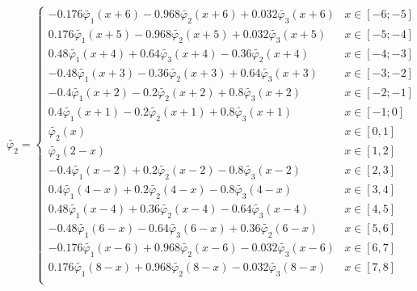 \documentclass[a4paper, 12pt,fleqn]{extarticle}
\begin{document}
    \[
        \tilde{\varphi_2}=
        \begin{cases}
           -0.176 \tilde{\varphi_1}(x+6) - 0.968 \tilde{\varphi_2}(x+6) + 0.032 \tilde{\varphi_3}(x+6)&x\in[-6;-5]\\
           0.176 \tilde{\varphi_1}(x+5) - 0.968 \tilde{\varphi_2}(x+5) + 0.032 \tilde{\varphi_3}(x+5)&x\in[-5;-4]\\
           0.48 \tilde{\varphi_1}(x+4) + 0.64 \tilde{\varphi_3}(x+4) - 0.36 \tilde{\varphi_2}(x+4)&x\in[-4;-3] \\
           -0.48 \tilde{\varphi_1}(x+3) - 0.36 \tilde{\varphi_2}(x+3) + 0.64 \tilde{\varphi_3}(x+3)&x\in[-3;-2] \\
           -0.4 \tilde{\varphi_1}(x+2) - 0.2 \tilde{\varphi_2}(x+2) + 0.8 \tilde{\varphi_3}(x+2)&x\in[-2;-1]\\
           0.4 \tilde{\varphi_1}(x+1) - 0.2 \tilde{\varphi_2}(x+1) + 0.8 \tilde{\varphi_3}(x+1)&x\in[-1;0]\\
           \tilde{\varphi_2}(x)&x\in[0,1]\\
           \tilde{\varphi_2}(2-x)&x\in[1,2]\\
           -0.4 \tilde{\varphi_1}(x-2) + 0.2 \tilde{\varphi_2}(x-2) - 0.8 \tilde{\varphi_3}(x-2)&x\in[2,3]\\
           0.4 \tilde{\varphi_1}(4-x) + 0.2 \tilde{\varphi_2}(4-x) - 0.8 \tilde{\varphi_3}(4-x) &x\in[3,4]\\
           0.48 \tilde{\varphi_1}(x-4) + 0.36 \tilde{\varphi_2}(x-4) - 0.64 \tilde{\varphi_3}(x-4)&x\in[4,5] \\
           -0.48 \tilde{\varphi_1}(6-x) - 0.64 \tilde{\varphi_3}(6-x) + 0.36 \tilde{\varphi_2}(6-x)&x\in[5,6] \\
           -0.176 \tilde{\varphi_1}(x-6) + 0.968 \tilde{\varphi_2}(x-6) - 0.032 \tilde{\varphi_3}(x-6)&x\in[6,7]\\
           0.176 \tilde{\varphi_1}(8-x) + 0.968 \tilde{\varphi_2}(8-x) - 0.032 \tilde{\varphi_3}(8-x)&x\in[7,8]\\
        \end{cases}\]
\end{document}
